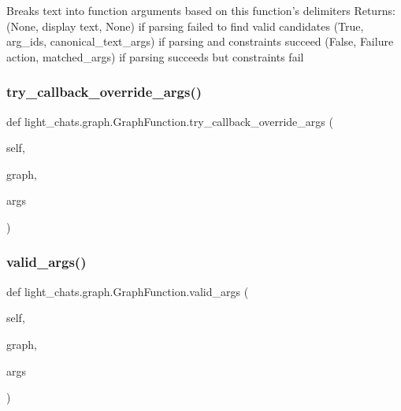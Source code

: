 \begin{DoxyVerb}Breaks text into function arguments based on this function's
delimiters
Returns:
(None, display text, None) if parsing failed to find valid candidates
(True, arg_ids, canonical_text_args) if parsing and constraints succeed
(False, Failure action, matched_args)
if parsing succeeds but constraints fail
\end{DoxyVerb}
 \mbox{\label{classlight__chats_1_1graph_1_1GraphFunction_a9769b13542f28f04977e374057bbc017}} 
\subsubsection{\texorpdfstring{try\+\_\+callback\+\_\+override\+\_\+args()}{try\_callback\_override\_args()}}
{\footnotesize\ttfamily def light\+\_\+chats.\+graph.\+Graph\+Function.\+try\+\_\+callback\+\_\+override\+\_\+args (\begin{DoxyParamCaption}\item[{}]{self,  }\item[{}]{graph,  }\item[{}]{args }\end{DoxyParamCaption})}

\mbox{\label{classlight__chats_1_1graph_1_1GraphFunction_a8ac297dcadb1e5ec360f55f293dcbfcb}} 
\subsubsection{\texorpdfstring{valid\+\_\+args()}{valid\_args()}}
{\footnotesize\ttfamily def light\+\_\+chats.\+graph.\+Graph\+Function.\+valid\+\_\+args (\begin{DoxyParamCaption}\item[{}]{self,  }\item[{}]{graph,  }\item[{}]{args }\end{DoxyParamCaption})}




